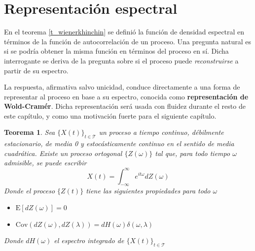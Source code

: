 \documentclass[12pt,letterpaper]{book}
\newtheorem{teorema}{Teorema}[chapter]
\newcommand{\intR}{\int_{-\infty}^{\infty}}
\newcommand{\E}[1]{\mathrm{E}\left[ #1 \right]}
\newcommand{\Cov}[1]{\mathrm{Cov}\left( #1 \right)}
\newcommand{\abso}[1]{\left| #1 \right|}
\newcommand{\xt}{$\{X(t)\}_{t\in \mathcal{T}}$ }
\begin{document}
\section{Representación espectral}

En el teorema \ref{t_wienerkhinchin} se definió la función de densidad espectral en términos de la función de autocorrelación de un proceso.
%
Una pregunta natural es si se podría obtener la misma función en términos del proceso en sí.
%
Dicha interrogante se deriva de la pregunta sobre si el proceso puede \textit{reconstruirse} a partir de su espectro.

La respuesta, afirmativa salvo unicidad, conduce directamente a una forma de representar al proceso en base a su espectro, conocida como \textbf{representación de Wold-Cramér}.
%
Dicha representación será usada con fluidez durante el resto de este capítulo, y como una motivación fuerte para el siguiente capítulo.

\begin{teorema}
Sea \xt un proceso a tiempo continuo, débilmente estacionario, de media 0 y estocásticamente continuo en el sentido de media cuadrática. Existe un proceso ortogonal $\{Z(\omega)\}$ tal que, para todo tiempo $\omega$ admisible, se puede escribir
\begin{equation*}
X(t) = \intR e^{i t \omega} dZ(\omega)
\end{equation*}
Donde el proceso $\{Z(t)\}$ tiene las siguientes propiedades para todo $\omega$
\begin{itemize}
\item $\E{dZ(\omega)} = 0$
\item $\Cov{dZ(\omega),dZ(\lambda)} = dH(\omega) \delta(\omega, \lambda)$
\end{itemize}
Donde $dH(\omega)$ el espectro integrado de \xt
\label{rep_espectral}
\end{teorema}
\end{document}
